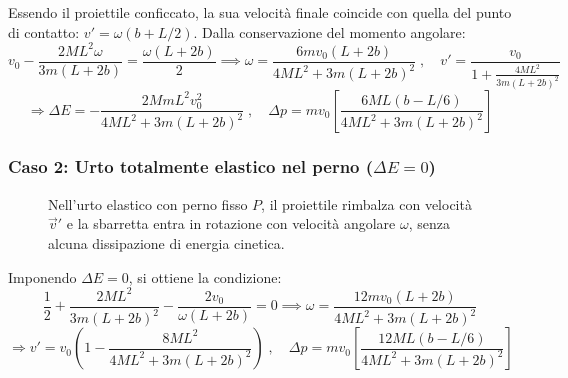Essendo il proiettile conficcato, la sua velocità finale coincide con quella del punto di contatto: $v' = \omega(b + L/2)$. Dalla conservazione del momento angolare:
\begin{equation}
    v_0 - \frac{2 M L^2 \omega}{3 m(L+2b)} = \frac{\omega(L+2b)}{2} \implies \omega = \frac{6 m v_0 (L+2b)}{4ML^2 + 3m(L+2b)^2} \; , \quad v' = \frac{v_0}{1 + \frac{4ML^2}{3m(L+2b)^2}}
\end{equation}
\begin{equation}
    \Rightarrow \Delta E = - \frac{2 M m L^2 v_0^2}{4ML^2 + 3m(L+2b)^2} \; , \quad \Delta p = m v_0 \left[ \frac{6ML(b - L/6)}{4ML^2 + 3m(L+2b)^2} \right]
\end{equation}

\subsubsection{Caso 2: Urto totalmente elastico nel perno ($\Delta E = 0$)}
\begin{figure}[ht]
\centering
{}
\caption{Nell'urto elastico con perno fisso $P$, il proiettile rimbalza con velocità $\vec{v}'$ e la sbarretta entra in rotazione con velocità angolare $\omega$, senza alcuna dissipazione di energia cinetica.}
\end{figure}

Imponendo $\Delta E = 0$, si ottiene la condizione:
\begin{equation}
    \frac{1}{2} + \frac{2ML^2}{3m(L+2b)^2} - \frac{2v_0}{\omega(L+2b)} = 0 \implies \omega = \frac{12 m v_0 (L+2b)}{4ML^2 + 3m(L+2b)^2}
\end{equation}
\begin{equation}
    \Rightarrow v' = v_0 \left( 1 - \frac{8 M L^2}{4ML^2 + 3m(L+2b)^2} \right) \; , \quad \Delta p = m v_0 \left[ \frac{12 M L(b - L/6)}{4ML^2 + 3m(L+2b)^2} \right]
\end{equation}

